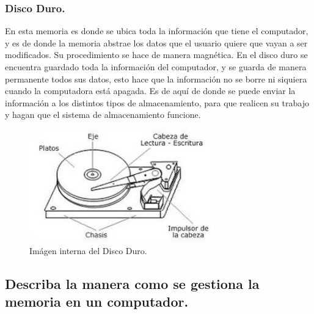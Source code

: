 \documentclass{article}
\begin{document}
\subsubsection{Disco Duro.}
En esta memoria es donde se ubica toda la información que tiene el computador, y es de donde la memoria abstrae los datos que el usuario quiere que vayan a ser modificados. Su procedimiento se hace de manera magnética. En el disco duro se encuentra guardado toda la información del computador, y se guarda de manera permanente todos sus datos, esto hace que la información no se borre ni siquiera cuando la computadora está apagada. Es de aquí de donde se puede enviar la información a los distintos tipos de almacenamiento, para que realicen su trabajo y hagan que el sistema de almacenamiento funcione.
\\
\begin{figure}[h]
\includegraphics[width=8cm]{imagen5.jpg}
\centering
\caption{Imágen interna del Disco Duro\cite{img5}.}
\label{fig:imagen5}
\end{figure}
\newpage
\subsection{Describa la manera como se gestiona la memoria en un computador.}
\end{document}
